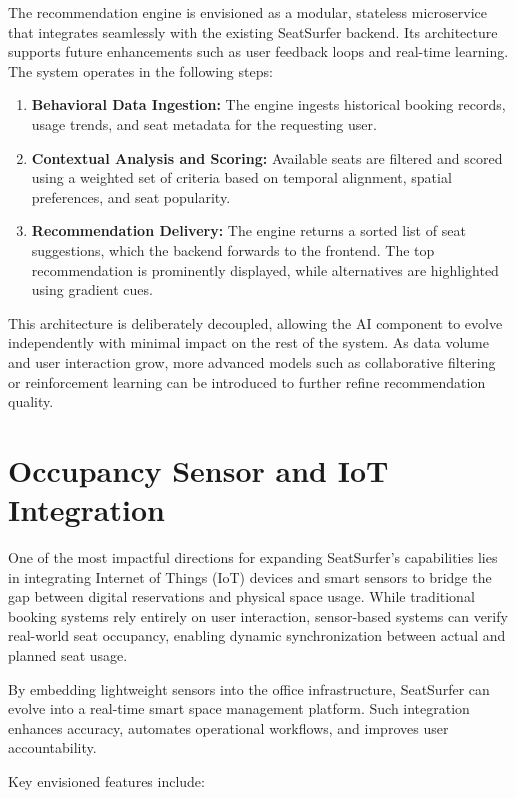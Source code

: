 \documentclass[12pt,a4paper]{report}
\begin{document}
The recommendation engine is envisioned as a modular, stateless microservice that integrates seamlessly with the existing SeatSurfer backend. Its architecture supports future enhancements such as user feedback loops and real-time learning. The system operates in the following steps:

\begin{enumerate}
\item \textbf{Behavioral Data Ingestion:}
The engine ingests historical booking records, usage trends, and seat metadata for the requesting user.
\item \textbf{Contextual Analysis and Scoring:}  
Available seats are filtered and scored using a weighted set of criteria based on temporal alignment, spatial preferences, and seat popularity.
\item \textbf{Recommendation Delivery:}  
The engine returns a sorted list of seat suggestions, which the backend forwards to the frontend. The top recommendation is prominently displayed, while alternatives are highlighted using gradient cues.
\end{enumerate}

This architecture is deliberately decoupled, allowing the AI component to evolve independently with minimal impact on the rest of the system. As data volume and user interaction grow, more advanced models such as collaborative filtering or reinforcement learning can be introduced to further refine recommendation quality.

\section{Occupancy Sensor and IoT Integration}

One of the most impactful directions for expanding SeatSurfer's capabilities lies in integrating Internet of Things (IoT) devices and smart sensors to bridge the gap between digital reservations and physical space usage. While traditional booking systems rely entirely on user interaction, sensor-based systems can verify real-world seat occupancy, enabling dynamic synchronization between actual and planned seat usage.

By embedding lightweight sensors into the office infrastructure, SeatSurfer can evolve into a real-time smart space management platform. Such integration enhances accuracy, automates operational workflows, and improves user accountability.

Key envisioned features include:
\end{document}
